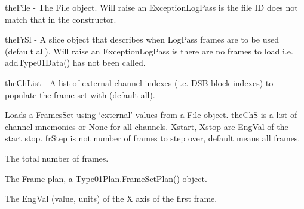 \documentclass[letterpaper,10pt,english]{sphinxmanual}
\begin{document}
\begin{fulllineitems}
\begin{fulllineitems}
theFile - The File object. Will raise an ExceptionLogPass is the file ID
does not match that in the constructor.

theFrSl - A slice object that describes when LogPass frames are to be used (default all).
Will raise an ExceptionLogPass is there are no frames to load
i.e. addType01Data() has not been called.

theChList - A list of external channel indexes (i.e. DSB block indexes)
to populate the frame set with (default all).

\end{fulllineitems}


\begin{fulllineitems}
\label{\detokenize{ref/LIS/core/LogPass:TotalDepth.LIS.core.LogPass.LogPass.setFrameSetChX}}
Loads a FramesSet using ‘external’ values from a File object.
theChS is a list of channel mnemonics or None for all channels.
Xstart, Xstop are EngVal of the start stop.
frStep is not number of frames to step over, default means all frames.

\end{fulllineitems}


\begin{fulllineitems}
\label{\detokenize{ref/LIS/core/LogPass:TotalDepth.LIS.core.LogPass.LogPass.totalFrames}}
The total number of frames.

\end{fulllineitems}


\begin{fulllineitems}
\label{\detokenize{ref/LIS/core/LogPass:TotalDepth.LIS.core.LogPass.LogPass.type01Plan}}
The Frame plan, a Type01Plan.FrameSetPlan() object.

\end{fulllineitems}


\begin{fulllineitems}
\label{\detokenize{ref/LIS/core/LogPass:TotalDepth.LIS.core.LogPass.LogPass.xAxisFirstEngVal}}
The EngVal (value, units) of the X axis of the first frame.


\end{fulllineitems}
\end{fulllineitems}
\end{document}
